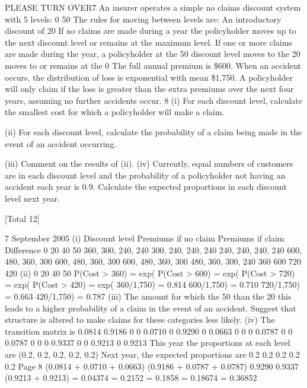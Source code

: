 \documentclass[a4paper,12pt]{article}
\begin{document}
 


PLEASE TURN OVER7
An insurer operates a simple no claims discount system with 5 levels: 0%
50%
The rules for moving between levels are:
An introductory discount of 20%
If no claims are made during a year the policyholder moves up to the next
discount level or remains at the maximum level.
If one or more claims are made during the year, a policyholder at the 50%
discount level moves to the 20%
moves to or remains at the 0%
The full annual premium is \$600.
When an accident occurs, the distribution of loss is exponential with mean \$1,750. A
policyholder will only claim if the loss is greater than the extra premiums over the
next four years, assuming no further accidents occur.
8
(i) For each discount level, calculate the smallest cost for which a policyholder
will make a claim.

(ii) For each discount level, calculate the probability of a claim being made in the
event of an accident occurring.

(iii) Comment on the results of (ii).
(iv) Currently, equal numbers of customers are in each discount level and the
probability of a policyholder not having an accident each year is 0.9.
Calculate the expected proportions in each discount level next year.

[Total 12]



7
September 2005
(i)
Discount level Premiums if no claim Premiums if claim Difference
0%
20%
40%
50%
360, 300, 240, 240
300, 240, 240, 240
240, 240, 240, 240 600, 480, 360, 300
600, 480, 360, 300
600, 480, 360, 300
480, 360, 300, 240 360
600
720
420
(ii)
0%
20%
40%
50%
P(Cost > 360) = exp(
P(Cost > 600) = exp(
P(Cost > 720) = exp(
P(Cost > 420) = exp(
360/1,750) = 0.814
600/1,750) = 0.710
720/1,750) = 0.663
420/1,750) = 0.787
(iii) The amount for which the 50%
than the 20%
this leads to a higher probability of a claim in the event of an accident.
Suggest that structure is altered to make claims for these categories less likely.
(iv) The transition matrix is
0.0814 0.9186 0
0
0.0710 0
0.9290 0
0.0663 0
0
0
0.0787 0
0
0.0787 0
0
0
0.9337 0
0
0.9213
0
0.9213
This year the proportions at each level are
(0.2, 0.2, 0.2, 0.2, 0.2)
Next year, the expected proportions are
0.2
0.2
0.2
0.2
0.2
Page 8
(0.0814 + 0.0710 + 0.0663)
(0.9186 + 0.0787 + 0.0787)
0.9290
0.9337
(0.9213 + 0.9213)
= 0.04374
= 0.2152
= 0.1858
= 0.18674
= 0.36852%
\end{document}
